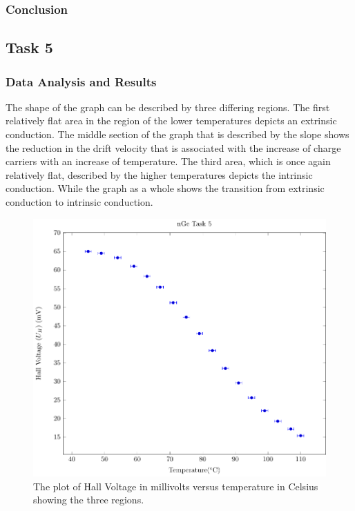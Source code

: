 \documentclass[a4paper]{article}
\begin{document}

\subsubsection{Conclusion}

\subsection{Task 5}

\subsubsection{Data Analysis and Results}

\qq The shape of the graph can be described by three differing
regions. The first relatively flat area in the region of the lower
temperatures depicts an extrinsic conduction. The middle section of
the graph that is described by the slope shows the reduction in the
drift velocity that is associated with the increase of charge carriers
with an increase of temperature. The third area, which is once again
relatively flat, described by the higher temperatures depicts the
intrinsic conduction. While the graph as a whole shows the transition
from extrinsic conduction to intrinsic conduction.

\begin{figure}[H]
  \begin{center}
    \includegraphics[scale=0.7]{NGePlots/Task5/nGeTask5.pdf}
  \end{center}
  \caption{The plot of Hall Voltage in millivolts versus temperature in Celsius
    showing the three regions.}
  \label{gph:nt5}
\end{figure}
\end{document}
